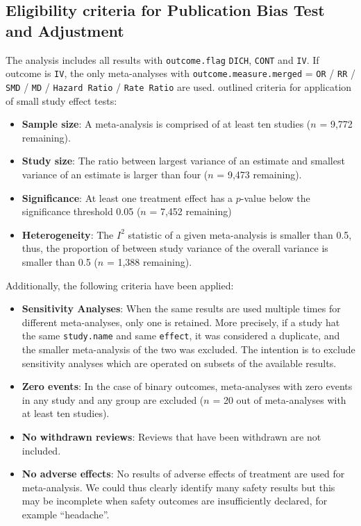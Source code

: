 \documentclass[11pt,a4paper,twoside]{book}\usepackage[]{graphicx}\usepackage[]{color}
\begin{document}
\subsection{Eligibility criteria for Publication Bias Test and Adjustment} 

The analysis includes all results with \texttt{outcome.flag} \texttt{DICH}, \texttt{CONT} and \texttt{IV}. If outcome is \texttt{IV}, the only meta-analyses with \texttt{outcome.measure.merged} = \texttt{OR} / \texttt{RR} / \texttt{SMD} / \texttt{MD} / \texttt{Hazard Ratio} / \texttt{Rate Ratio} are used. 
\citet{Ioannidis2007} outlined criteria for application of small study effect tests:
\begin{itemize}
\item \textbf{Sample size}: A meta-analysis is comprised of at least ten studies ($n$ = 9,772 remaining). 
\item \textbf{Study size}: The ratio between largest variance of an estimate and smallest variance of an estimate is larger than four ($n$ = 9,473 remaining).
\item \textbf{Significance}: At least one treatment effect has a $p$-value below the significance threshold 0.05 ($n$ = 7,452 remaining)
\item \textbf{Heterogeneity}: The $I^2$ statistic of a given meta-analysis is smaller than 0.5, thus, the proportion of between study variance of the overall variance is smaller than 0.5 ($n$ = 1,388 remaining).
\end{itemize}
Additionally, the following criteria have been applied:
\begin{itemize}
\item \textbf{Sensitivity Analyses}: When the same results are used multiple times for different meta-analyses, only one is retained. More precisely, if a study hat the same \texttt{study.name} and same \texttt{effect}, it was considered a duplicate, and the smaller meta-analysis of the two was excluded. The intention is to exclude sensitivity analyses which are operated on subsets of the available results.
\item \textbf{Zero events}: In the case of binary outcomes, meta-analyses with zero events in any study and any group are excluded ($n$ = 20 out of meta-analyses with at least ten studies).
\item \textbf{No withdrawn reviews}: Reviews that have been withdrawn are not included.
\item \textbf{No adverse effects}: No results of adverse effects of treatment are used for meta-analysis. We could thus clearly identify many safety results but this may be incomplete when safety outcomes are insufficiently declared, for example ``headache''.
\end{itemize}
\end{document}
